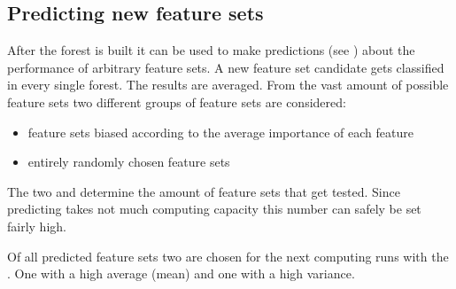 \documentclass[letterpaper,10pt,english]{sphinxmanual}
\begin{document}
\subsection{Predicting new feature sets}
\label{\detokenize{RF:predicting-new-feature-sets}}
After the forest is built it can be used to make predictions (see {\hyperref[\detokenize{RF:forest-predict}]{}}) about the performance of arbitrary feature sets.
A new feature set candidate gets classified in every single forest.
The results are averaged.
From the vast amount of possible feature sets two different groups of feature sets are considered:
\begin{itemize}
\item {} 
feature sets biased according to the average importance of each feature

\item {} 
entirely randomly chosen feature sets

\end{itemize}

The two {\hyperref[\detokenize{execution:hyperparameters}]{}}  and  determine the amount of feature sets that get tested.
Since predicting takes not much computing capacity this number can safely be set fairly high.

Of all predicted feature sets two are chosen for the next computing runs with the {\hyperref[\detokenize{Overview:mla}]{}}. One with a high average (mean) and one with a high variance.
\end{document}
